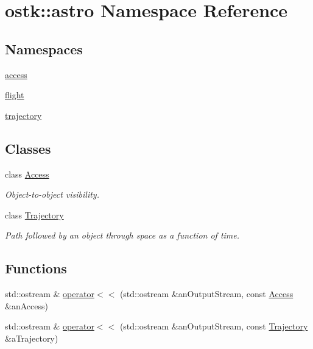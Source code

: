\hypertarget{namespaceostk_1_1astro}{}\section{ostk\+:\+:astro Namespace Reference}
\label{namespaceostk_1_1astro}
\subsection*{Namespaces}
\begin{DoxyCompactItemize}
\item 
 \hyperlink{namespaceostk_1_1astro_1_1access}{access}
\item 
 \hyperlink{namespaceostk_1_1astro_1_1flight}{flight}
\item 
 \hyperlink{namespaceostk_1_1astro_1_1trajectory}{trajectory}
\end{DoxyCompactItemize}
\subsection*{Classes}
\begin{DoxyCompactItemize}
\item 
class \hyperlink{classostk_1_1astro_1_1_access}{Access}
\begin{DoxyCompactList}\small\item\em Object-\/to-\/object visibility. \end{DoxyCompactList}\item 
class \hyperlink{classostk_1_1astro_1_1_trajectory}{Trajectory}
\begin{DoxyCompactList}\small\item\em Path followed by an object through space as a function of time. \end{DoxyCompactList}\end{DoxyCompactItemize}
\subsection*{Functions}
\begin{DoxyCompactItemize}
\item 
std\+::ostream \& \hyperlink{namespaceostk_1_1astro_ad6bf403749e98996e2e56cd6dc8cc848}{operator$<$$<$} (std\+::ostream \&an\+Output\+Stream, const \hyperlink{classostk_1_1astro_1_1_access}{Access} \&an\+Access)
\item 
std\+::ostream \& \hyperlink{namespaceostk_1_1astro_a0cb767c3814a31416e0491406bc56ed2}{operator$<$$<$} (std\+::ostream \&an\+Output\+Stream, const \hyperlink{classostk_1_1astro_1_1_trajectory}{Trajectory} \&a\+Trajectory)
\end{DoxyCompactItemize}


